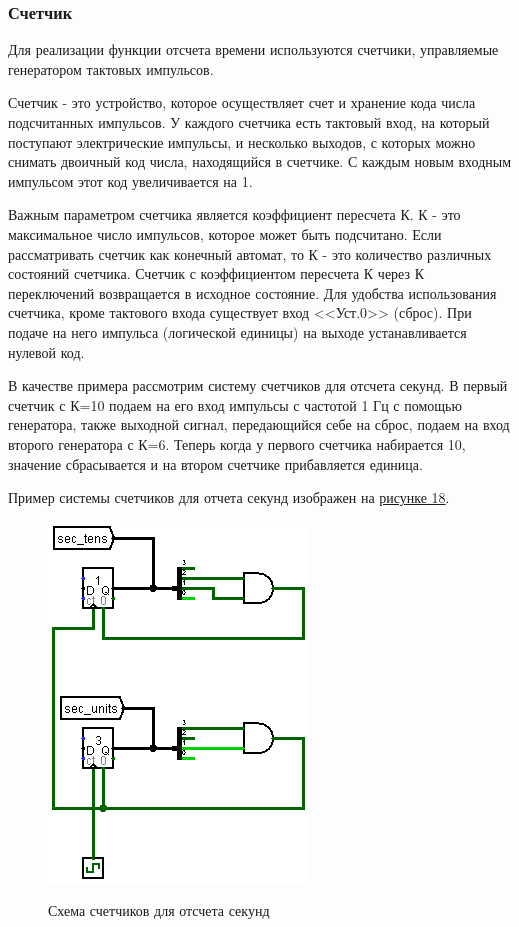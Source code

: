 \documentclass[10pt,a4paper,final]{article} %
\begin{document}
\subsubsection{Счетчик}

Для реализации функции отсчета времени используются счетчики, управляемые генератором тактовых импульсов. 

Счетчик - это устройство, которое осуществляет счет и хранение кода числа подсчитанных импульсов. У каждого счетчика есть тактовый вход, на который поступают электрические импульсы, и несколько выходов, с которых можно снимать двоичный код числа, находящийся в счетчике. С каждым новым входным импульсом этот код увеличивается на 1.

Важным параметром счетчика является коэффициент пересчета К. К - это максимальное число импульсов, которое может быть подсчитано. Если рассматривать счетчик как конечный автомат, то К - это количество 
различных состояний счетчика. Счетчик с коэффициентом пересчета К через К переключений возвращается в исходное состояние. Для удобства использования счетчика, кроме тактового входа существует вход <<Уст.0>> (сброс). При подаче на него импульса (логической единицы) на выходе устанавливается нулевой код.

В качестве примера рассмотрим систему счетчиков для отсчета секунд. В первый счетчик с К=10 подаем на его вход импульсы с частотой 1 Гц с помощью генератора, также выходной сигнал, передающийся себе на сброс, подаем на вход второго генератора с К=6. Теперь когда у первого счетчика набирается 10, значение сбрасывается и на втором счетчике прибавляется единица. 

Пример системы счетчиков для отчета секунд изображен на \hyperref[counters]{рисунке 18}.

 \begin{figure}[htpb]
	\centering
	\includegraphics[scale=0.4]{logisim/img/counters.png}
	\label{counters} 
	\caption{Схема счетчиков для отсчета секунд}
\end{figure}
\end{document}
